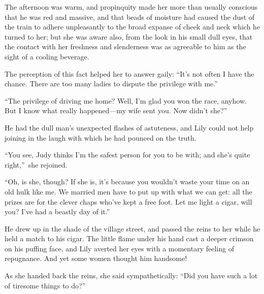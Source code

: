 \documentclass[12pt,a4paper]{book}
\begin{document}
The afternoon was warm, and propinquity made her more than
usually conscious that he was red and massive, and that beads of
moisture had caused the dust of the train to adhere unpleasantly
to the broad expanse of cheek and neck which he turned to her;
but she was aware also, from the look in his small dull eyes,
that the contact with her freshness and slenderness was as
agreeable to him as the sight of a cooling beverage.





The perception of this fact helped her to answer gaily: ``It's not
often I have the chance. There are too many ladies to dispute the
privilege with me.''





``The privilege of driving me home? Well, I'm glad you won
the race, anyhow. But I know what really happened---my wife sent
you. Now didn't she?''





He had the dull man's unexpected flashes of astuteness, and Lily
could not help joining in the laugh with which he had pounced on
the truth.





``You see, Judy thinks I'm the safest person for you to be with;
and she's quite right,''\ she rejoined.





``Oh, is she, though? If she is, it's because you wouldn't waste
your time on an old hulk like me. We married men have to put up
with what we can get: all the prizes are for the clever chaps
who've kept a free foot. Let me light a cigar, will you? I've had
a beastly day of it.''





He drew up in the shade of the village street, and passed the
reins to her while he held a match to his cigar. The little flame
under his hand cast a deeper crimson on his puffing face, and
Lily averted her eyes with a momentary feeling of repugnance. And
yet some women thought him handsome!





As she handed back the reins, she said sympathetically: ``Did you
have such a lot of tiresome things to do?''
\end{document}
